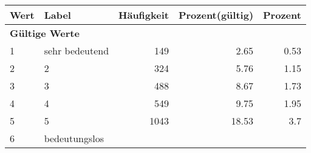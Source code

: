      \begin{longtable}{lXrrr}
     \toprule
     \textbf{Wert} & \textbf{Label} & \textbf{Häufigkeit} & \textbf{Prozent(gültig)} & \textbf{Prozent} \\
     \endhead
     \midrule
     \multicolumn{5}{l}{\textbf{Gültige Werte}}\\

     1 &
     \multicolumn{1}{X}{ sehr bedeutend   } &


       \num{149} &
       \num[round-mode=places,round-precision=2]{2.65} &
         \num[round-mode=places,round-precision=2]{0.53} \\

     2 &
     \multicolumn{1}{X}{ 2   } &


       \num{324} &
       \num[round-mode=places,round-precision=2]{5.76} &
         \num[round-mode=places,round-precision=2]{1.15} \\

     3 &
     \multicolumn{1}{X}{ 3   } &


       \num{488} &
       \num[round-mode=places,round-precision=2]{8.67} &
         \num[round-mode=places,round-precision=2]{1.73} \\

     4 &
     \multicolumn{1}{X}{ 4   } &


       \num{549} &
       \num[round-mode=places,round-precision=2]{9.75} &
         \num[round-mode=places,round-precision=2]{1.95} \\

     5 &
     \multicolumn{1}{X}{ 5   } &


       \num{1043} &
       \num[round-mode=places,round-precision=2]{18.53} &
         \num[round-mode=places,round-precision=2]{3.7} \\

     6 &
     \multicolumn{1}{X}{ bedeutungslos   } &



\end{longtable}
